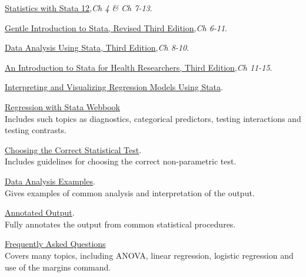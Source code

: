 \documentclass{article}
\begin{document}
\begin{compactitem}
\item \href{http://www.stata.com/bookstore/statistics-with-stata/}{Statistics with Stata 12},\textit{Ch 4 \& Ch 7-13}.
\item \href{http://statapress.com/books/gentle-introduction-to-stata/}{Gentle Introduction to Stata, Revised Third Edition},\textit{Ch 6-11}.
\item \href{http://statapress.com/books/data-analysis-using-stata/}{Data Analysis Using Stata, Third Edition},\textit{Ch 8-10}.
\item \href{http://statapress.com/books/introduction-stata-health-researchers/}{An Introduction to Stata for Health Researchers, Third Edition},\textit{Ch 11-15}.
\item \href{http://statapress.com/books/interpreting-visualizing-regression-models/}{Interpreting and Visualizing Regression Models Using Stata}.
\item \href{http://www.ats.ucla.edu/stat/stata/webbooks/reg/default.htm}{Regression with Stata Webbook}\\
Includes such topics as diagnostics, categorical predictors, testing interactions and testing contrasts.
\item \href{http://www.ats.ucla.edu/stat/mult_pkg/whatstat/default.htm}{Choosing the Correct Statistical Test}.\\
Includes guidelines for choosing the correct non-parametric test.
\item \href{http://www.ats.ucla.edu/stat/dae/default.htm}{Data Analysis Examples}.\\
Gives examples of common analysis and interpretation of the output.
\item \href{http://www.ats.ucla.edu/stat/AnnotatedOutput/default.htm}{Annotated Output}.\\
Fully annotates the output from common statistical procedures.
\item \href{http://www.ats.ucla.edu/stat/stata/faq/default.htm}{Frequently Asked Questions} \\
Covers many topics, including ANOVA, linear regression, logistic regression and  use of the margins command.
\end{compactitem}
\end{document}

